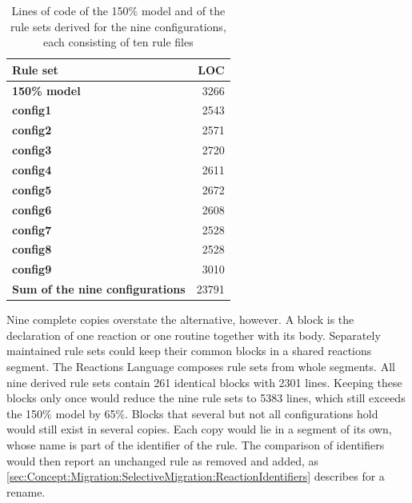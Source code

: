 \begin{table}[htbp]
    \centering
    \begin{tabular}{|l|r|}
        \hline
        \textbf{Rule set}                       & \textbf{LOC} \\
        \hline
        \textbf{150\% model}                    & 3266         \\
        \hline
        \textbf{config1}                        & 2543         \\
        \hline
        \textbf{config2}                        & 2571         \\
        \hline
        \textbf{config3}                        & 2720         \\
        \hline
        \textbf{config4}                        & 2611         \\
        \hline
        \textbf{config5}                        & 2672         \\
        \hline
        \textbf{config6}                        & 2608         \\
        \hline
        \textbf{config7}                        & 2528         \\
        \hline
        \textbf{config8}                        & 2528         \\
        \hline
        \textbf{config9}                        & 3010         \\
        \hline
        \textbf{Sum of the nine configurations} & 23791        \\
        \hline
    \end{tabular}
    \caption{Lines of code of the 150\% model and of the rule sets derived for the nine configurations, each consisting of ten rule files}
    \label{table:rule-set-size}
\end{table}

Nine complete copies overstate the alternative, however.
A block is the declaration of one reaction or one routine together with its body.
Separately maintained rule sets could keep their common blocks in a shared reactions segment.
The Reactions Language composes rule sets from whole segments.
All nine derived rule sets contain 261 identical blocks with 2301 lines.
Keeping these blocks only once would reduce the nine rule sets to 5383 lines, which still exceeds the 150\% model by 65\%.
Blocks that several but not all configurations hold would still exist in several copies.
Each copy would lie in a segment of its own, whose name is part of the identifier of the rule.
The comparison of identifiers would then report an unchanged rule as removed and added, as \autoref{sec:Concept:Migration:SelectiveMigration:ReactionIdentifiers} describes for a rename.

